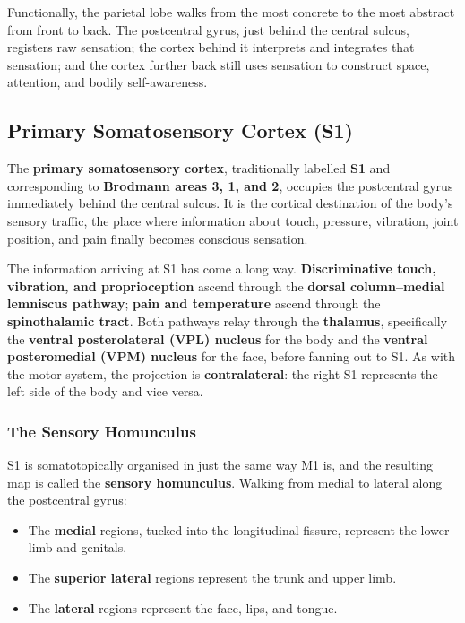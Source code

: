 \documentclass[11pt]{article}
\begin{document}
Functionally, the parietal lobe walks from the most concrete to the most abstract from front to back. The postcentral gyrus, just behind the central sulcus, registers raw sensation; the cortex behind it interprets and integrates that sensation; and the cortex further back still uses sensation to construct space, attention, and bodily self-awareness.

\subsection{Primary Somatosensory Cortex (S1)}

The \textbf{primary somatosensory cortex}, traditionally labelled \textbf{S1} and corresponding to \textbf{Brodmann areas 3, 1, and 2}, occupies the postcentral gyrus immediately behind the central sulcus. It is the cortical destination of the body's sensory traffic, the place where information about touch, pressure, vibration, joint position, and pain finally becomes conscious sensation.

The information arriving at S1 has come a long way. \textbf{Discriminative touch, vibration, and proprioception} ascend through the \textbf{dorsal column--medial lemniscus pathway}; \textbf{pain and temperature} ascend through the \textbf{spinothalamic tract}. Both pathways relay through the \textbf{thalamus}, specifically the \textbf{ventral posterolateral (VPL) nucleus} for the body and the \textbf{ventral posteromedial (VPM) nucleus} for the face, before fanning out to S1. As with the motor system, the projection is \textbf{contralateral}: the right S1 represents the left side of the body and vice versa.

\subsubsection{The Sensory Homunculus}

S1 is somatotopically organised in just the same way M1 is, and the resulting map is called the \textbf{sensory homunculus}. Walking from medial to lateral along the postcentral gyrus:

\begin{itemize}
    \item The \textbf{medial} regions, tucked into the longitudinal fissure, represent the lower limb and genitals.
    \item The \textbf{superior lateral} regions represent the trunk and upper limb.
    \item The \textbf{lateral} regions represent the face, lips, and tongue.
\end{itemize}
\end{document}
